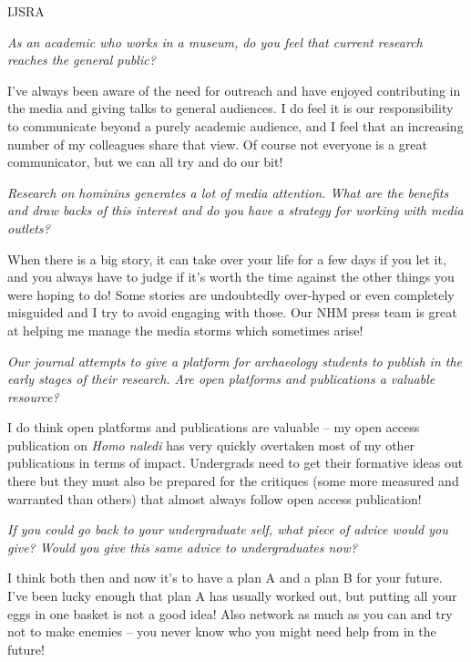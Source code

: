 \documentclass{ijsra}
\begin{document}
\begin{labeling}{IJSRA}
\item[IJSRA]
\emph{As an academic who works in a museum, do you feel that current research reaches the general public?}

\item[CS]
I’ve always been aware of the need for outreach and have enjoyed contributing in the media and
giving talks to general audiences.
I do feel it is our responsibility to communicate beyond a purely academic audience, and I feel that an increasing number of
my colleagues share that view. 
Of course not everyone is a great communicator, but we can all try and do our bit!

\item[IJSRA]
\emph{Research on hominins generates a lot of media attention.
What are the benefits and draw backs of this interest and do you have a strategy for working with media outlets?}

\item[CS]
When there is a big story, it can take over your life for a few days if you let it,
and you always have to judge if it’s worth the time against the other things you were hoping to do!
Some stories are undoubtedly over-hyped or even completely misguided and I try to avoid engaging with those.
Our NHM press team is great at helping me manage the media storms which sometimes arise!

\item[IJSRA]
\emph{Our journal attempts to give a platform for archaeology students to publish in the early stages of their research.
Are open platforms and publications a valuable resource?}

\item[CS]
I do think open platforms and publications are valuable – my open access publication on \emph{Homo naledi} has
very quickly overtaken most of my other publications in terms of impact.
Undergrads need to get their formative ideas out there but they must also be prepared for the critiques
(some more measured and warranted than others) that almost always follow open access publication!

\item[IJSRA]
\emph{If you could go back to your undergraduate self, what piece of advice would you give?
Would you give this same advice to undergraduates now?}

\item[CS]
I think both then and now it’s to have a plan A and a plan B for your future.
I’ve been lucky enough that plan A has usually worked out, but putting all your eggs in one basket is not a good idea!
Also network as much as you can and try not to make enemies – you never know who you might need help from in the future!

\end{labeling}
\end{document}
